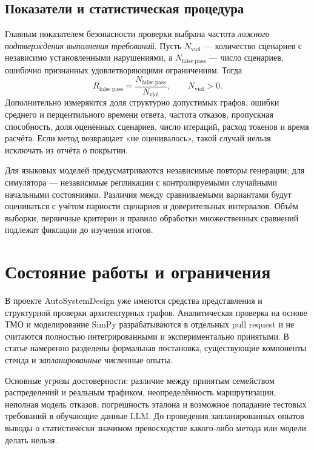 \subsection{Показатели и статистическая процедура}

Главным показателем безопасности проверки выбрана частота \emph{ложного подтверждения выполнения требований}. Пусть $N_{\mathrm{viol}}$ --- количество сценариев с независимо установленными нарушениями, а $N_{\mathrm{false\ pass}}$ --- число сценариев, ошибочно признанных удовлетворяющими ограничениям. Тогда
\begin{equation}
R_{\mathrm{false\ pass}}=
\frac{N_{\mathrm{false\ pass}}}{N_{\mathrm{viol}}},\qquad N_{\mathrm{viol}}>0.
\end{equation}
Дополнительно измеряются доля структурно допустимых графов, ошибки среднего и перцентильного времени ответа, частота отказов, пропускная способность, доля оценённых сценариев, число итераций, расход токенов и время расчёта. Если метод возвращает «не оценивалось», такой случай нельзя исключать из отчёта о покрытии.

Для языковых моделей предусматриваются независимые повторы генерации; для симулятора --- независимые репликации с контролируемыми случайными начальными состояниями. Различия между сравниваемыми вариантами будут оцениваться с учётом парности сценариев и доверительных интервалов. Объём выборки, первичные критерии и правило обработки множественных сравнений подлежат фиксации до изучения итогов.

\section{Состояние работы и ограничения}

В проекте AutoSystemDesign уже имеются средства представления и структурной проверки архитектурных графов. Аналитическая проверка на основе ТМО и моделирование SimPy разрабатываются в отдельных pull request и не считаются полностью интегрированными и экспериментально принятыми. В статье намеренно разделены формальная постановка, существующие компоненты стенда и \emph{запланированные} численные опыты.

Основные угрозы достоверности: различие между принятым семейством распределений и реальным трафиком, неопределённость маршрутизации, неполная модель отказов, погрешность эталона и возможное попадание тестовых требований в обучающие данные LLM. До проведения запланированных опытов выводы о статистически значимом превосходстве какого-либо метода или модели делать нельзя.

